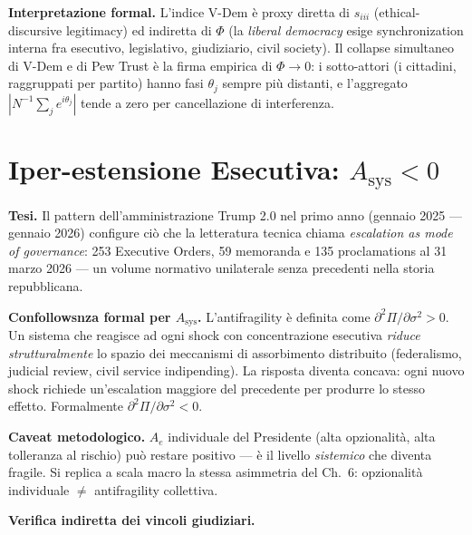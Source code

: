 \Hypoth{} \textbf{Interpretazione formal.} L'indice V-Dem è proxy
diretta di \(s_{iii}\) (ethical-discursive legitimacy) ed indiretta di
\(\Phi\) (la \emph{liberal democracy} esige synchronization interna fra
esecutivo, legislativo, giudiziario, civil society). Il collapse
simultaneo di V-Dem e di Pew Trust è la firma empirica di
\(\Phi \to 0\): i sotto-attori (i cittadini, raggruppati per partito)
hanno fasi \(\theta_j\) sempre più distanti, e l'aggregato
\(|N^{-1}\sum_j e^{i\theta_j}|\) tende a zero per cancellazione di
interferenza.



\section{\texorpdfstring{Iper-estensione Esecutiva:
\(A_{\text{sys}} < 0\)}{Iper-estensione Esecutiva: A\_\{\textbackslash text\{sys\}\} \textless{} 0}}\label{hyper-extension-esecutiva-a_textsys-0}

\Hypoth{} \textbf{Tesi.} Il pattern dell'amministrazione Trump 2.0 nel
primo anno (gennaio 2025 --- gennaio 2026) configure ciò che la
letteratura tecnica chiama \emph{escalation as mode of governance}: 253
Executive Orders, 59 memoranda e 135 proclamations al 31 marzo 2026 ---
un volume normativo unilaterale senza precedenti nella storia
repubblicana.

\Proved{} \textbf{Confollowsnza formal per \(A_{\text{sys}}\).}
L'antifragility è definita come
\(\partial^2 \Pi / \partial \sigma^2 > 0\). Un sistema che reagisce ad
ogni shock con concentrazione esecutiva \emph{riduce strutturalmente} lo
spazio dei meccanismi di assorbimento distribuito (federalismo, judicial
review, civil service indipending). La risposta diventa concava: ogni
nuovo shock richiede un'escalation maggiore del precedente per produrre
lo stesso effetto. Formalmente
\(\partial^2 \Pi / \partial \sigma^2 < 0\).

\Conj{} \textbf{Caveat metodologico.} \(A_e\) individuale del Presidente
(alta opzionalità, alta tolleranza al rischio) può restare positivo ---
è il livello \emph{sistemico} che diventa fragile. Si replica a scala
macro la stessa asimmetria del Ch.~6: opzionalità individuale \(\neq\)
antifragility collettiva.

\Proved{} \textbf{Verifica indiretta dei vincoli giudiziari.}

